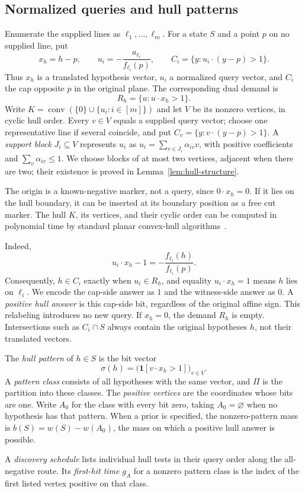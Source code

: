 \subsection{Normalized queries and hull patterns}

\begin{definition}\label{def:normalized-queries}
Enumerate the supplied lines as $\ell_1,\ldots,\ell_m$.
For a state $S$ and a point $p$ on no supplied line, put
\[
 x_h=h-p,\qquad
 u_i=-\frac{a_{\ell_i}}{f_{\ell_i}(p)},\qquad
 C_i=\{y:u_i\cdot(y-p)>1\}.
\]
Thus $x_h$ is a translated hypothesis vector, $u_i$ a normalized
query vector, and $C_i$ the cap opposite $p$ in the original plane.
The corresponding dual demand is
\[
 R_h=\{u:u\cdot x_h>1\}.
\]
Write $K=\operatorname{conv}(\{0\}\cup\{u_i:i\in[m]\})$ and let
$V$ be its nonzero vertices, in cyclic hull order.
Every $v\in V$ equals a supplied query vector; choose one
representative line if several coincide, and put
$C_v=\{y:v\cdot(y-p)>1\}$.
A \emph{support block} $J_i\subseteq V$ represents $u_i$ as
$u_i=\sum_{v\in J_i}\alpha_{iv}v$, with positive coefficients
and $\sum_v\alpha_{iv}\le1$. We choose blocks of at most two
vertices, adjacent when there are two; their existence is proved
in Lemma~\ref{lem:hull-structure}.
\end{definition}

The origin is a known-negative marker, not a query, since
$0\cdot x_h=0$. If it lies on the hull boundary, it can be inserted
at its boundary position as a free cut marker. The hull $K$, its
vertices, and their cyclic order can be computed in polynomial time
by standard planar convex-hull algorithms~\cite{deberg2008}.

Indeed,
\[
 u_i\cdot x_h-1=-\frac{f_{\ell_i}(h)}{f_{\ell_i}(p)}.
\]
Consequently, $h\in C_i$ exactly when $u_i\in R_h$, and equality
$u_i\cdot x_h=1$ means $h$ lies on $\ell_i$.
We encode the cap-side answer as $1$ and the witness-side answer
as $0$. A \emph{positive hull answer} is this cap-side bit,
regardless of the original affine sign. This relabeling introduces
no new query. If $x_h=0$, the demand $R_h$ is empty.
Intersections such as $C_i\cap S$ always contain the original
hypotheses $h$, not their translated vectors.

\begin{definition}\label{def:hull-pattern}
The \emph{hull pattern} of $h\in S$ is the bit vector
\[
 \sigma(h)=\bigl(\mathbf1[v\cdot x_h>1]\bigr)_{v\in V}.
\]
A \emph{pattern class} consists of all hypotheses with the same
vector, and $\Pi$ is the partition into these classes.
The \emph{positive vertices} are the coordinates whose bits are one.
Write $A_0$ for the class with every bit zero, taking
$A_0=\varnothing$ when no hypothesis has that pattern.
When a prior is specified, the nonzero-pattern mass is
$b(S)=w(S)-w(A_0)$, the mass on which a positive hull answer is possible.
\end{definition}

A \emph{discovery schedule} lists individual hull tests in their
query order along the all-negative route. Its \emph{first-hit time}
$g_A$ for a nonzero pattern class is the index of the first listed
vertex positive on that class.
